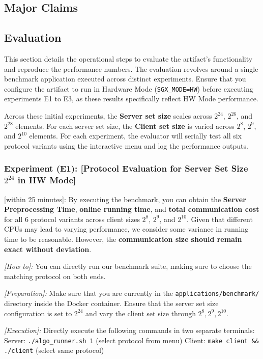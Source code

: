 \documentclass[conference]{IEEEtran}
\begin{document}
\subsection{Major Claims}

\subsection{Evaluation}
This section details the operational steps to evaluate the artifact's functionality and reproduce the performance numbers. The evaluation revolves around a single benchmark application executed across distinct experiments. Ensure that you configure the artifact to run in Hardware Mode (\texttt{SGX\_MODE=HW}) before executing experiments E1 to E3, as these results specifically reflect HW Mode performance.

Across these initial experiments, the \textbf{Server set size} scales across $2^{24}$, $2^{26}$, and $2^{28}$ elements. For each server set size, the \textbf{Client set size} is varied across $2^{8}$, $2^{9}$, and $2^{10}$ elements. For each experiment, the evaluator will serially test all six protocol variants using the interactive menu and log the performance outputs.

\subsubsection{Experiment (E1): [Protocol Evaluation for Server Set Size $2^{24}$ in HW Mode]}
[within 25 minutes]: By executing the benchmark, you can obtain the \textbf{Server Preprocessing Time}, \textbf{online running time}, and \textbf{total communication cost} for all 6 protocol variants across client sizes $2^8$, $2^9$, and $2^{10}$. Given that different CPUs may lead to varying performance, we consider some variance in running time to be reasonable. However, the \textbf{communication size should remain exact without deviation}.

\textit{[How to]:} You can directly run our benchmark suite, making sure to choose the matching protocol on both ends.

\textit{[Preparation]:} Make sure that you are currently in the \texttt{applications/benchmark/} directory inside the Docker container. Ensure that the server set size configuration is set to $2^{24}$ and vary the client set size through $2^8, 2^9, 2^{10}$.

\textit{[Execution]:} Directly execute the following commands in two separate terminals:
Server: \texttt{./algo\_runner.sh 1} (select protocol from menu)
Client: \texttt{make client \&\& ./client} (select same protocol)
\end{document}
